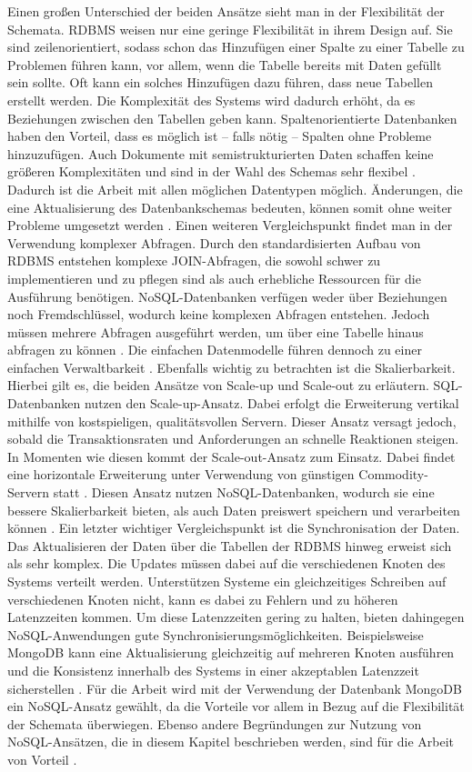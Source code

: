 Einen großen Unterschied der beiden Ansätze sieht man in der Flexibilität der Schemata. RDBMS weisen nur eine geringe Flexibilität in ihrem Design auf. Sie sind zeilenorientiert, sodass schon das Hinzufügen einer Spalte zu einer Tabelle zu Problemen führen kann, vor allem, wenn die Tabelle bereits mit Daten gefüllt sein sollte. Oft kann ein solches Hinzufügen dazu führen, dass neue Tabellen erstellt werden. Die Komplexität des Systems wird dadurch erhöht, da es Beziehungen zwischen den Tabellen geben kann.
Spaltenorientierte Datenbanken haben den Vorteil, dass es möglich ist – falls nötig – Spalten ohne Probleme hinzuzufügen. Auch Dokumente mit semistrukturierten Daten schaffen keine größeren Komplexitäten und sind in der Wahl des Schemas sehr flexibel \cite[S.19]{zwei}. Dadurch ist die Arbeit mit allen möglichen Datentypen möglich. Änderungen, die eine Aktualisierung des Datenbankschemas bedeuten, können somit ohne weiter Probleme umgesetzt werden \cite[S.18]{zwei}. 
Einen weiteren Vergleichspunkt findet man in der Verwendung komplexer Abfragen. Durch den standardisierten Aufbau von RDBMS entstehen komplexe JOIN-Abfragen, die sowohl schwer zu implementieren und zu pflegen sind als auch erhebliche Ressourcen für die Ausführung benötigen. NoSQL-Datenbanken verfügen weder über Beziehungen noch Fremdschlüssel, wodurch keine komplexen Abfragen entstehen. Jedoch müssen mehrere Abfragen ausgeführt werden, um über eine Tabelle hinaus abfragen zu können \cite[S19f.]{zwei}. Die einfachen Datenmodelle führen dennoch zu einer einfachen Verwaltbarkeit \cite[S.18]{zwei}. 
Ebenfalls wichtig zu betrachten ist die Skalierbarkeit. Hierbei gilt es, die beiden Ansätze von Scale-up und Scale-out zu erläutern. SQL-Datenbanken nutzen den Scale-up-Ansatz. Dabei erfolgt die Erweiterung vertikal mithilfe von kostspieligen, qualitätsvollen Servern. Dieser Ansatz versagt jedoch, sobald die Transaktionsraten und Anforderungen an schnelle Reaktionen steigen. In Momenten wie diesen kommt der Scale-out-Ansatz zum Einsatz. Dabei findet eine horizontale Erweiterung unter Verwendung von günstigen Commodity-Servern statt \cite[S.18]{zwei}. Diesen Ansatz nutzen NoSQL-Datenbanken, wodurch sie eine bessere Skalierbarkeit bieten, als auch Daten preiswert speichern und verarbeiten können \cite[S.19f.]{zwei}.
Ein letzter wichtiger Vergleichspunkt ist die Synchronisation der Daten. Das Aktualisieren der Daten über die Tabellen der RDBMS hinweg erweist sich als sehr komplex. Die Updates müssen dabei auf die verschiedenen Knoten des Systems verteilt werden. Unterstützen Systeme ein gleichzeitiges Schreiben auf verschiedenen Knoten nicht, kann es dabei zu Fehlern und zu höheren Latenzzeiten kommen. 
Um diese Latenzzeiten gering zu halten, bieten dahingegen NoSQL-Anwendungen gute Synchronisierungsmöglichkeiten. Beispielsweise MongoDB kann eine Aktualisierung gleichzeitig auf mehreren Knoten ausführen und die Konsistenz innerhalb des Systems in einer akzeptablen Latenzzeit sicherstellen \cite[S.19f.]{zwei}.
Für die Arbeit wird mit der Verwendung der Datenbank MongoDB ein NoSQL-Ansatz gewählt, da die Vorteile vor allem in Bezug auf die Flexibilität der Schemata überwiegen. Ebenso andere Begründungen zur Nutzung von NoSQL-Ansätzen, die in diesem Kapitel beschrieben werden, sind für die Arbeit von Vorteil \cite[S.17-20]{zwei}.

